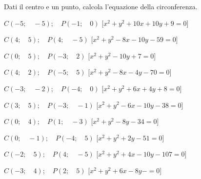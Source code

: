 \begin{esercizio}\label{ese:}
 Dati il centro e un punto, calcola l'equazione della circonferenza.
 \begin{enumeratea}
  \item  \(C \left (-5; \quad -5 \right ); \quad P \left (-1; \quad 0 \right )\)
   \hfill [\(x^2 + y^2 +10x +10y +9 = 0\)]
  \item  \(C \left (4; \quad 5 \right ); \quad P \left (4; \quad -5 \right )\)
   \hfill [\(x^2 + y^2 -8x -10y -59 = 0\)]
  \item  \(C \left (0; \quad 5 \right ); \quad P \left (-3; \quad 2 \right )\)
   \hfill [\(x^2 + y^2 -10y +7 = 0\)]
  \item  \(C \left (4; \quad 2 \right ); \quad P \left (-5; \quad 5 \right )\)
   \hfill [\(x^2 + y^2 -8x -4y -70 = 0\)]
  \item  \(C \left (-3; \quad -2 \right ); \quad P \left (-4; \quad 0 \right )\)
   \hfill [\(x^2 + y^2 +6x +4y +8 = 0\)]
  \item  \(C \left (3; \quad 5 \right ); \quad P \left (-3; \quad -1 \right )\)
   \hfill [\(x^2 + y^2 -6x -10y -38 = 0\)]
  \item  \(C \left (0; \quad 4 \right ); \quad P \left (1; \quad -3 \right )\)
   \hfill [\(x^2 + y^2 -8y -34 = 0\)]
  \item  \(C \left (0; \quad -1 \right ); \quad P \left (-4; \quad 5 \right )\)
   \hfill [\(x^2 + y^2 +2y -51 = 0\)]
  \item  \(C \left (-2; \quad 5 \right ); \quad P \left (4; \quad -5 \right )\)
   \hfill [\(x^2 + y^2 +4x -10y -107 = 0\)]
  \item  \(C \left (-3; \quad 4 \right ); \quad P \left (2; \quad 5 \right )\)
   \hfill [\(x^2 + y^2 +6x -8y - = 0\)]
 \end{enumeratea}
\end{esercizio}


